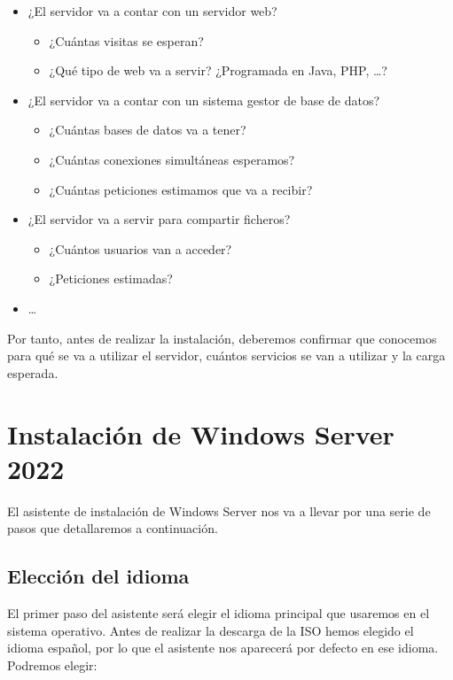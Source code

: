 \begin{itemize}
    \item ¿El servidor va a contar con un servidor web?
    \begin{itemize}
        \item ¿Cuántas visitas se esperan?
        \item ¿Qué tipo de web va a servir? ¿Programada en Java, PHP, …?
    \end{itemize}
    \item ¿El servidor va a contar con un sistema gestor de base de datos?
    \begin{itemize}
        \item ¿Cuántas bases de datos va a tener?
        \item ¿Cuántas conexiones simultáneas esperamos?
        \item ¿Cuántas peticiones estimamos que va a recibir?
    \end{itemize}
    \item ¿El servidor va a servir para compartir ficheros?
    \begin{itemize}
        \item ¿Cuántos usuarios van a acceder?
        \item ¿Peticiones estimadas?
    \end{itemize}
    \item …
\end{itemize}

Por tanto, antes de realizar la instalación, deberemos confirmar que conocemos para qué se va a utilizar el servidor, cuántos servicios se van a utilizar y la carga esperada.

\hypertarget{instalar_windows_server}{}
\section{Instalación de Windows Server 2022}
El asistente de instalación de Windows Server nos va a llevar por una serie de pasos que detallaremos a continuación.

\subsection{Elección del idioma}

El primer paso del asistente será elegir el idioma principal que usaremos en el sistema operativo.
Antes de realizar la descarga de la ISO hemos elegido el idioma español, por lo que el asistente nos aparecerá por defecto en ese idioma. Podremos elegir:


